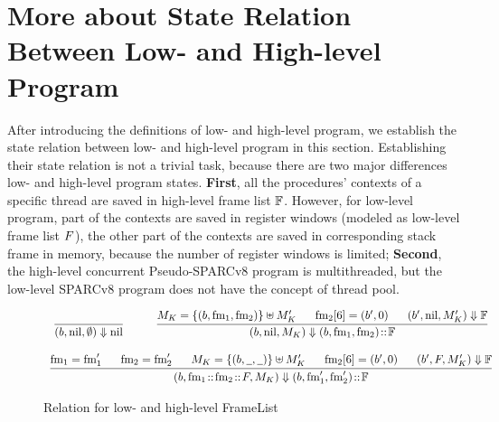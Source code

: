 \section{More about State Relation Between Low- and High-level Program}
\label{sec:more-staterel}

After introducing the definitions of low- and high-level program, 
we establish the state relation between low- and high-level program 
in this section. Establishing their state relation is not a trivial 
task, because there are two major differences low- and high-level 
program states. \textbf{First}, all the procedures' contexts of 
a specific thread are saved in high-level frame list $\mathbb{F}$. 
However, for low-level program, part of the contexts are saved in 
register windows (modeled as low-level frame list $F$), the 
other part of the contexts are saved in corresponding stack frame 
in memory, because the number of register windows is limited; 
\textbf{Second}, the high-level concurrent Pseudo-SPARCv8 program 
is multithreaded, but the low-level SPARCv8 program does not have 
the concept of thread pool. 

\begin{figure}[!t]
    \centering
    \small
    \[
        \begin{array}{c}
            \infer
            {
                \stkRel{(\block, \nil, \emptyset)}{\nil}
            }
            {} \qquad \quad
            \infer
            {
                \stkRel{(\block, \nil, \Mem_K)}{(\block, \fm_1, \fm_2) \stCons \hWstk}
            }
            {
                \Mem_K = \framMem{(\block, \fm_1, \fm_2)} \uplus \Mem_K' 
                \quad \ \ \fm_2[6] = (\block', 0) \quad \ \  
                \stkRel{(\block', \nil, \Mem_K')}{\hWstk}
            } \\
            \\
            \infer
            {
                \stkRel{(\block,
                	\fm_1 \stCons \fm_2 \stCons \Wstack, \Mem_K)}
                    {(\block, \fm_1', \fm_2') \stCons \hWstk}
            }
            {
                \fm_1 = \fm_1' \quad \ \ \fm_2 = \fm_2' \quad \ \  
                \Mem_K = \framMem{(\block, \notCare, \notCare)} \uplus \Mem_K'
                \quad \ \ 
                \fm_2[6] = (\block', 0) \quad \ \ 
                \stkRel{(\block', \Wstack, \Mem_K')}{\hWstk}
            }
        \end{array}
    \]
    \caption{Relation for low- and high-level FrameList}
    \label{fig:relation-low-high-level-framelist}
\end{figure}

